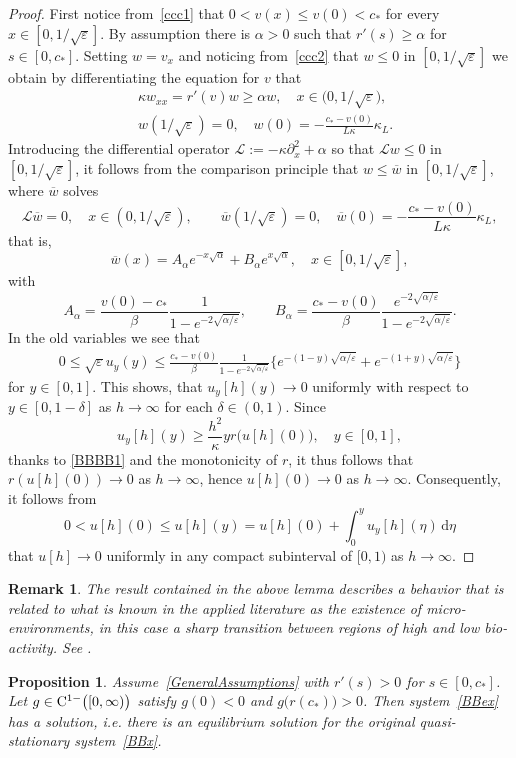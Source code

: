 \documentclass[reqno,11pt]{amsart}
\newtheorem{prop}[thm]{Proposition}
\newtheorem{rem}[thm]{Remark}
\numberwithin{equation}{section}
\newcommand{\rd}{\mathrm{d}}
\begin{document}
\begin{proof}
First notice from~\eqref{ccc1} that  $0<v(x)\le v(0)<c_*$ for every
$x\in \left[ 0,1/\sqrt{\varepsilon}\right]$.  By assumption there is
$\alpha>0$ such that $r'(s)\ge \alpha$ for $s\in [0,c_*]$. 
Setting $w=v_x$ and noticing from~\eqref{ccc2} that $w\le 0$  in
$\left[ 0,1/\sqrt{\varepsilon}\right]$ we obtain by differentiating
the equation for $v$ that 
\begin{align*}
  &\kappa w_{xx}=r'(v)w\ge \alpha w, \quad x\in \bigl(
    0,1/\sqrt{\varepsilon}\bigr), \\
  & w(1/\sqrt{\varepsilon})=0,\quad
    w(0)=-\frac{c_*-v(0)}{L\kappa}\kappa_L.
\end{align*}
Introducing the differential operator $\mathcal{L}:=-\kappa\partial_x^2+\alpha$ so that $\mathcal{L}w\le 0$ in $\left[0,1/\sqrt{\varepsilon}\right]$, it follows from the comparison principle that $w\le \overline{w}$ in $\left[0,1/\sqrt{\varepsilon}\right]$, where $\overline{w}$ solves
$$
\mathcal{L}\overline{w}=0,\quad  x\in (0,1/\sqrt{\varepsilon}),
\qquad\overline{w}(1/\sqrt{\varepsilon})=0,\quad
\overline{w}(0)=-\frac{c_*-v(0)}{L\kappa}\kappa_L,
$$
that is,
$$
\overline{w}(x)= A_\alpha e^{-x\sqrt{\alpha}}+B_\alpha
e^{x\sqrt{\alpha}}, \quad x\in \left[ 0,1/\sqrt{\varepsilon}\right],
$$
with
$$
  A_\alpha=\frac{v(0)-c_*}{\beta}\frac{1}{1-e^{-2\sqrt{\alpha/\varepsilon}}}, \qquad
  B_\alpha=\frac{c_*-v(0)}{\beta}\frac{e^{-2\sqrt{\alpha/\varepsilon}}}{1-e^{-2\sqrt{\alpha/\varepsilon}}}.
$$
In the old variables we see that
\begin{align*}
0\le \sqrt{\varepsilon}u_y(y)\leq
\frac{c_*-v(0)}{\beta}\frac{1}{1-e^{-2\sqrt{\alpha/\varepsilon}}} 
\Big\{e^{-(1-y)\sqrt{\alpha/\varepsilon}}+e^{-(1+y)\sqrt{\alpha/\varepsilon}}\Bigr\}
\end{align*}
for $y\in [0,1]$. This shows, that $u_y[h](y) \to 0$
uniformly with respect to $y\in [0,1-\delta]$ as $h\to \infty$ for
each $\delta\in (0,1)$. Since 
$$
u_y[h](y)\ge\frac{h^2}{\kappa}y r\big(u[h](0)\big), \quad y\in[0,1],
$$
thanks to \eqref{BBBB1} and the monotonicity of $r$, it thus follows
that $r(u[h](0))\to 0$ as $h\to \infty$, hence $u[h](0)\to 0$ as $h\to
\infty$. Consequently, it follows from
$$
0< u[h](0)\le u[h](y)=u[h](0)+\int_0^y u_y[h](\eta)\,\rd \eta
$$
that $u[h]\to 0$  uniformly  
in any compact subinterval of $[0,1)$ as $h\to\infty$.
\end{proof}
\begin{rem}
The result contained in the above lemma describes a behavior that is
related to what is known in the applied literature as the existence of
micro-environments, in this case a sharp transition between regions of
high and low bio-activity. See \cite[Section 3.2]{KD10}.
\end{rem}
\begin{prop}
Assume~\eqref{GeneralAssumptions} with $r'(s)>0$ for $s\in [0,c_*]$. Let $g\in
{\rm C}^{1-}\bigl([0,\infty)\bigr)$ satisfy $g(0)<0$ and
$g\bigl( r(c_*)\bigr)>0$. Then system~\eqref{BBex} has
a solution, i.e. there is an equilibrium solution for the original
quasi-stationary system~\eqref{BBx}.
\end{prop}
\end{document}
